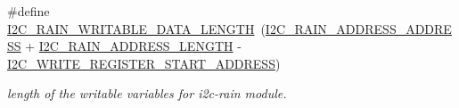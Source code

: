 \begin{DoxyCompactItemize}
\mbox{\label{registers-rain_8h_ab18763172e0c3d07bce932542f3e6044}} 
\#define \hyperlink{registers-rain_8h_ab18763172e0c3d07bce932542f3e6044}{I2\+C\+\_\+\+R\+A\+I\+N\+\_\+\+W\+R\+I\+T\+A\+B\+L\+E\+\_\+\+D\+A\+T\+A\+\_\+\+L\+E\+N\+G\+TH}~(\hyperlink{registers-rain_8h_a80ceb2e20b5e46f7be4fe67afa070962}{I2\+C\+\_\+\+R\+A\+I\+N\+\_\+\+A\+D\+D\+R\+E\+S\+S\+\_\+\+A\+D\+D\+R\+E\+SS} + \hyperlink{registers-rain_8h_a71aabb131056ec935e30daee63068ca1}{I2\+C\+\_\+\+R\+A\+I\+N\+\_\+\+A\+D\+D\+R\+E\+S\+S\+\_\+\+L\+E\+N\+G\+TH} -\/ \hyperlink{registers_8h_ad980dee82f83659f0a84e3e1f3c177bb}{I2\+C\+\_\+\+W\+R\+I\+T\+E\+\_\+\+R\+E\+G\+I\+S\+T\+E\+R\+\_\+\+S\+T\+A\+R\+T\+\_\+\+A\+D\+D\+R\+E\+SS})
\begin{DoxyCompactList}\small\item\em length of the writable variables for i2c-\/rain module. \end{DoxyCompactList}\end{DoxyCompactItemize}
